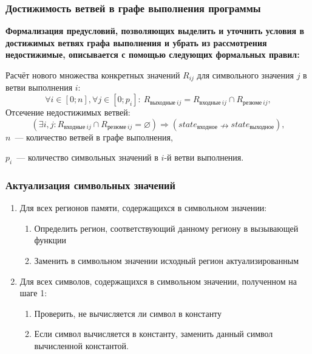 \documentclass[hyperref={pdfpagelabels=false},10pt,gray]{beamer}
\begin{document}
\begin{frame}
\frametitle{Достижимость ветвей в графе выполнения программы}

\textbf{Формализация предусловий, позволяющих выделить и уточнить условия в достижимых ветвях графа выполнения и убрать из рассмотрения недостижимые, описывается с помощью следующих формальных правил: }

\vspace{20pt}

Расчёт нового множества конкретных значений $R_{ij}$ для символьного значения $j$ в ветви выполнения $i$:
\begin{equation*}
\label{result_sval}
 \forall i \in [0; n], \forall j \in [0; p_i]:\ R_{\text{выходные}\ ij} =  R_{\text{входные}\ ij} \cap R_{\text{резюме}\ ij},
\end{equation*}
Отсечение недостижимых ветвей:
\begin{equation*}
 \label{empty_set}
 (\exists i, j: R_{\text{входные}\ ij} \cap R_{\text{резюме}\ ij} = \varnothing)  \Rightarrow (state_{\text{входное}} \nrightarrow state_{\text{выходное}}),
\end{equation*}
$n$~--- количество ветвей в графе выполнения,

$p_{i}$~--- количество символьных значений в $i$-й ветви выполнения.


\end{frame}

\begin{frame}
\frametitle{Актуализация символьных значений}

\begin{enumerate}
 \item Для всех регионов памяти, содержащихся в символьном значении:
 \begin{enumerate}
  \item Определить регион, соответствующий данному региону в вызывающей функции
  \item Заменить в символьном значении исходный регион актуализированным
 \end{enumerate}
 \item Для всех символов, содержащихся в символьном значении, полученном на шаге 1:
  \begin{enumerate}
  \item Проверить, не вычисляется ли символ в константу
  \item Если символ вычисляется в константу, заменить данный символ вычисленной константой.
 \end{enumerate}

\end{enumerate}
\end{frame}
\end{document}
